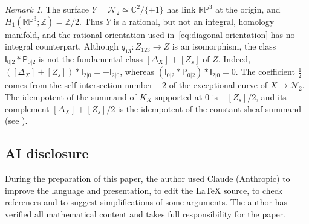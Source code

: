 \documentclass[11pt,a4paper]{amsart}
\theoremstyle{definition}
\theoremstyle{remark}
\newtheorem{remark}[theorem]{Remark}
\newcommand{\C}{\mathbb C}
\newcommand{\N}{\mathcal N}
\numberwithin{equation}{section}
\begin{document}
\begin{remark}\label{rem:integral-middle}
The surface $Y=\N_2\simeq\C^2/\{\pm1\}$ has link $\mathbb{RP}^3$ at the
origin, and $H_1(\mathbb{RP}^3;\mathbb Z)=\mathbb Z/2$. Thus $Y$ is a
rational, but not an integral, homology manifold, and the rational
orientation used in~\eqref{eq:diagonal-orientation} has no integral
counterpart. Although $q_{13}:Z_{123}\to Z$ is an isomorphism, the class
$\mathsf I_{0|2}*\mathsf P_{0|2}$ is not the fundamental class
$[\Delta_X]+[Z_s]$ of $Z$. Indeed,
$([\Delta_X]+[Z_s])*\mathsf I_{2|0}=-\mathsf I_{2|0}$, whereas
$(\mathsf I_{0|2}*\mathsf P_{0|2})*\mathsf I_{2|0}=0$. The coefficient
$\tfrac12$ comes from the self-intersection number $-2$ of the
exceptional curve of $X\to\N_2$. The idempotent of the summand of $K_X$
supported at $0$ is $-[Z_s]/2$, and its complement $[\Delta_X]+[Z_s]/2$
is the idempotent of the constant-sheaf summand (see
\cite[Section~2.4]{dCM04}).
\end{remark}

\subsection*{AI disclosure}
During the preparation of this paper, the author used Claude (Anthropic)
to improve the language and presentation, to edit the \LaTeX{} source, to
check references and to suggest simplifications of some arguments. The
author has verified all mathematical content and takes full
responsibility for the paper.
\end{document}
